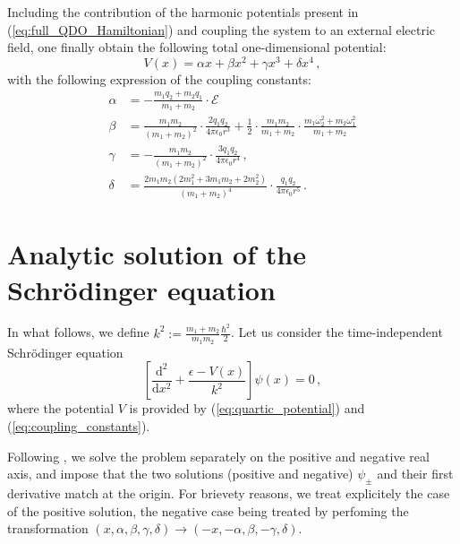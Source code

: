 \documentclass[reprint, amsmath, amssymb, aps, prl]{revtex4-2}
\begin{document}
        Including the contribution of the harmonic potentials present in (\ref{eq:full_QDO_Hamiltonian}) and coupling the system to an external electric field, one finally obtain the following total one-dimensional potential:
        \begin{equation}
        \label{eq:quartic_potential}
            V(x) = \alpha x + \beta x^2 + \gamma x^3 + \delta x^4 \,,
        \end{equation}
        with the following expression of the coupling constants:
        \begin{subequations}
        \label{eq:coupling_constants}
        \begin{align}
            \alpha &= -\frac{m_1 q_2 + m_2 q_1}{m_1+m_2}\cdot \mathcal E\\
            \beta &= \frac{m_1m_2}{(m_1+m_2)^2}\cdot\frac{2q_1 q_2}{4\pi\epsilon_0r^3} + \frac{1}{2}\cdot\frac{m_1m_2}{m_1+m_2}\cdot\frac{m_1\omega_2^2+m_2\omega_1^2}{m_1+m_2}\\
            \gamma&=-\frac{m_1m_2}{(m_1+m_2)^2}\cdot\frac{3 q_1 q_2}{4\pi\epsilon_0r^4}\,,\\
            \delta&=\frac{2m_1m_2(2m_1^2+3m_1m_2+2m_2^2)}{(m_1+m_2)^4}\cdot\frac{q_1 q_2}{4\pi\epsilon_0r^5}\,.
        \end{align}
        \end{subequations}

\section{Analytic solution of the Schr\"odinger equation}

    In what follows, we define $k^2:=\frac{m_1+m_2}{m_1 m_2}\frac{\hbar^2}{2}$.
    Let us consider the time-independent Schr\"odinger equation
    \begin{equation}
        \left[\frac{\text{d}^2}{\text{d}x^2} + \frac{\epsilon - V(x)}{k^2}\right]\psi(x) = 0\,,
    \end{equation}
    where the potential $V$ is provided by (\ref{eq:quartic_potential}) and (\ref{eq:coupling_constants}).

    Following \cite{Lay_1998}, we solve the problem separately on the positive and negative real axis, and impose that the two solutions (positive and negative) $\psi_\pm$ and their first derivative match at the origin. For brievety reasons, we treat explicitely the case of the positive solution, the negative case being treated by perfoming the transformation $(x, \alpha, \beta, \gamma, \delta)\rightarrow (-x, -\alpha, \beta, -\gamma, \delta)$.
\end{document}

